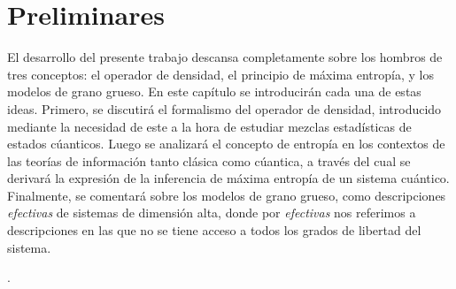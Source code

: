 \chapter{Preliminares}
El desarrollo del presente trabajo descansa completamente sobre los hombros de tres conceptos: el operador de densidad, el principio de máxima entropía, y los modelos de grano grueso. En este capítulo se introducirán cada una de estas ideas. Primero, se discutirá el formalismo del operador de densidad, introducido mediante la necesidad de este a la hora de estudiar mezclas estadísticas de estados cúanticos. Luego se analizará el concepto de entropía en los contextos de las teorías de información tanto clásica como cúantica, a través del cual se derivará la expresión de la inferencia de máxima entropía de un sistema cuántico. Finalmente, se comentará sobre los modelos de grano grueso, como descripciones \textit{efectivas} de sistemas de dimensión alta, donde por \textit{efectivas} nos referimos a descripciones en las que no se tiene acceso a todos los grados de libertad del sistema. 

. 









\newpage